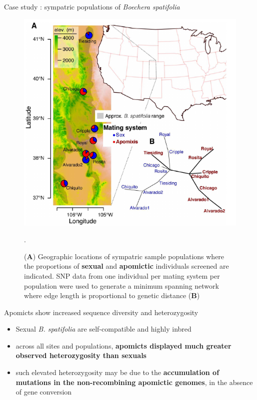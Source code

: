 \documentclass[final,20pt]{beamer}
\newlength{\colwidth}
\begin{document}
\begin{frame}[t]
\begin{columns}[t]
\begin{column}{\colwidth}
\begin{block}{Case study : sympatric populations of \textit{Boechera spatifolia}}
\begin{figure}
      \begin{minipage}[c]{0.67\textwidth}
      \includegraphics[width=\textwidth]{./fig1.png}
      \end{minipage}\hfill
      \begin{minipage}[c]{0.3\textwidth}
      \caption{(\textbf{A}) Geographic locations of sympatric sample populations 
      where the proportions of {\color{blue}\textbf{sexual}} and
      {\color{red}\textbf{apomictic}} individuals screened are indicated. 
      SNP data from one individual per mating system per population were used to 
      generate a minimum spanning network where edge length is proportional to genetic
      distance (\textbf{B})}.
      \end{minipage}
    \end{figure}

  \end{block}

  \begin{block}{Apomicts show increased sequence diversity and heterozygosity}
    \begin{itemize}
      \item Sexual \textit{B. spatifolia} are self-compatible and highly inbred
      \item across all sites and populations, 
      \textbf{apomicts displayed much greater observed heterozygosity than sexuals}
      \item such elevated heterozygosity may be due to the \textbf{accumulation of mutations in
      the non-recombining apomictic genomes}, in the absence of gene conversion
    \end{itemize}
    

\end{block}
\end{column}
\end{columns}
\end{frame}
\end{document}
